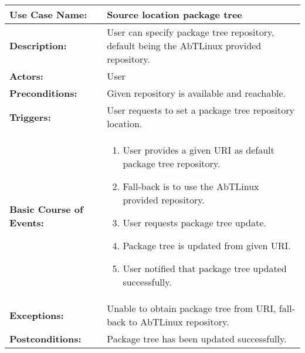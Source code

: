 
\begin{tabularx}{\linewidth}{|l|X|}
\hline
\textbf{Use Case Name:} & \textbf{Source location package tree} \\
\hline
\textbf{Description:} & 
User can specify package tree repository, default being the AbTLinux provided repository. \\
\hline
\textbf{Actors:} & User \\
\hline
\textbf{Preconditions:} & 
Given repository is available and reachable. \\
\hline
\textbf{Triggers:} & 
User requests to set a package tree repository location. \\
\hline
\textbf{Basic Course of Events:} & 
\begin{minipage}{\linewidth} 
  \vspace{0.05em}
  \begin{enumerate}
    \item User provides a given URI as default package tree repository.
    \item Fall-back is to use the AbTLinux provided repository.
    \item User requests package tree update.
    \item Package tree is updated from given URI.
    \item User notified that package tree updated successfully.
  \end{enumerate}
  \vspace{0.05em}
\end{minipage}
\\
\hline
\textbf{Exceptions:} & 
Unable to obtain package tree from URI, fall-back to AbTLinux repository. \\
\hline 
\textbf{Postconditions:} &
Package tree has been updated successfully. \\
\hline
\end{tabularx}


